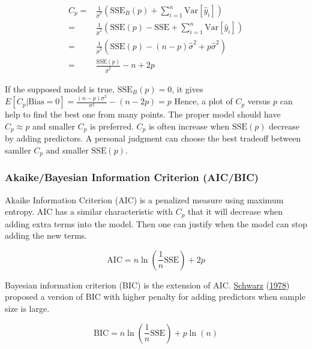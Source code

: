 \documentclass[
  11pt,
  openany]{memoir}
\begin{document}
\begin{equation}
\begin{split}
C_p=&\frac{1}{\hat\sigma^2}( \mathrm{SSE}_B(p) + \sum_{i=1}^n\mathrm{Var}[\hat y_i] )\\
=&\frac{1}{\hat\sigma^2}( \mathrm{SSE}(p) - \mathrm{SSE} + \sum_{i=1}^n\mathrm{Var}[\hat y_i] )\\
=&\frac{1}{\hat\sigma^2}( \mathrm{SSE}(p) - (n-p)\hat\sigma^2 + p\hat\sigma^2 )\\
=&\frac{\mathrm{SSE}(p)}{\hat\sigma^2} - n + 2p
\end{split}
\end{equation}

If the supposed model is true, \(\mathrm{SSE}_B(p)=0\), it gives \(E[C_p|\mathrm{Bias}=0] = \frac{(n-p)\sigma^2}{\sigma^2}-(n-2p)=p\)
Hence, a plot of \(C_p\) versus \(p\) can help to find the best one from many points. The proper model should have \(C_p\approx p\) and smaller \(C_p\) is preferred.
\(C_p\) is often increase when \(\mathrm{SSE}(p)\) decrease by adding predictors. A personal judgment can choose the best tradeoff between samller \(C_p\) and smaller \(\mathrm{SSE}(p)\).

\hypertarget{akaikebayesian-information-criterion-aicbic}{%
\subsubsection{Akaike/Bayesian Information Criterion (AIC/BIC)}\label{akaikebayesian-information-criterion-aicbic}}

Akaike Information Criterion (AIC) is a penalized measure using maximum entropy.
AIC has a similar characteristic with \(C_p\) that it will decrease when adding extra terms into the model. Then one can justify when the model can stop adding the new terms.

\begin{equation}
\mathrm{AIC}=n\ln\left(\frac1n \mathrm{SSE} \right)+ 2p
\label{eq:aic}
\end{equation}

Bayesian information criterion (BIC) is the extension of AIC. \protect\hyperlink{ref-schwarzEstimatingDimensionModel1978}{Schwarz} (\protect\hyperlink{ref-schwarzEstimatingDimensionModel1978}{1978}) proposed a version of BIC with higher penalty for adding predictors when sample size is large.

\begin{equation}
\mathrm{BIC}=n\ln\left(\frac{1}{n} \mathrm{SSE} \right)+ p\ln(n)
\label{eq:bic}
\end{equation}
\end{document}

